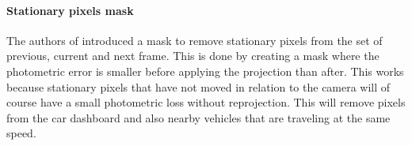 \paragraph{Stationary pixels mask} The authors of \cite{monodepth2} introduced a mask to remove stationary pixels from the set of previous, current and next frame. This is done by creating a mask where the photometric error is smaller before applying the projection than after. This works because stationary pixels that have not moved in relation to the camera will of course have a small photometric loss without reprojection. This will remove pixels from the car dashboard and also nearby vehicles that are traveling at the same speed.

